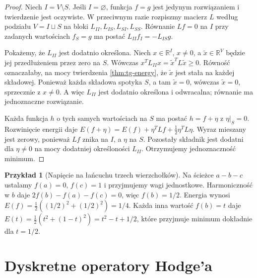 \documentclass[11pt,a4paper]{report}
\numberwithin{equation}{section}
\theoremstyle{plain}
\theoremstyle{definition}
\newtheorem{przyklad}[twierdzenie]{Przykład}
\theoremstyle{remark}
\begin{document}
\begin{proof}
Niech $I=V\setminus S$. Jeśli $I=\varnothing$, funkcja $f=g$
jest jedynym rozwiązaniem i twierdzenie jest oczywiste.
W przeciwnym razie rozpiszmy macierz $L$ według podziału
$V=I\sqcup S$ na bloki $L_{II},L_{IS},L_{SI},L_{SS}$.
Równanie $Lf=0$ na $I$ przy zadanych wartościach
$f_S=g$ ma postać $L_{II}f_I=-L_{IS}g$.

Pokażemy, że $L_{II}$ jest dodatnio określona. Niech
$x\in\mathbb R^I$, $x\ne0$, a $\widetilde x\in\mathbb R^V$
będzie jej przedłużeniem przez zero na $S$.
Wówczas $x^TL_{II}x=\widetilde x^TL\widetilde x\ge0$.
Równość oznaczałaby, na mocy twierdzenia
\ref{thm:tg-energy}, że $\widetilde x$ jest stała
na każdej składowej. Ponieważ każda składowa spotyka $S$,
a tam $\widetilde x=0$, wówczas $\widetilde x=0$,
sprzecznie z $x\ne0$. A więc $L_{II}$ jest dodatnio
określona i odwracalna; równanie ma jednoznaczne rozwiązanie.

Każda funkcja $h$ o tych samych wartościach na $S$
ma postać $h=f+\eta$ z $\eta|_S=0$.
Rozwinięcie energii daje
$E(f+\eta)=E(f)+\eta^TLf+\tfrac12\eta^TL\eta$.
Wyraz mieszany jest zerowy, ponieważ $Lf$ znika na
$I$, a $\eta$ na $S$. Pozostały składnik jest dodatni
dla $\eta\ne0$ na mocy dodatniej określoności $L_{II}$.
Otrzymujemy jednoznaczność minimum.
\end{proof}

\begin{przyklad}[Napięcie na łańcuchu trzech wierzchołków]
Na ścieżce $a-b-c$ ustalamy $f(a)=0$, $f(c)=1$
i przyjmujemy wagi jednostkowe. Harmoniczność w $b$ daje
$2f(b)-f(a)-f(c)=0$, więc $f(b)=1/2$.
Energia wynosi $E(f)=\tfrac12((1/2)^2+(1/2)^2)=1/4$.
Każda inna wartość $f(b)=t$ daje
$E(t)=\tfrac12(t^2+(1-t)^2)=t^2-t+1/2$,
które przyjmuje minimum dokładnie dla $t=1/2$.
\end{przyklad}

\begin{center}
\end{center}

\section{Dyskretne operatory Hodge'a}
\label{sec:tg-hodge-operators}
\end{document}
